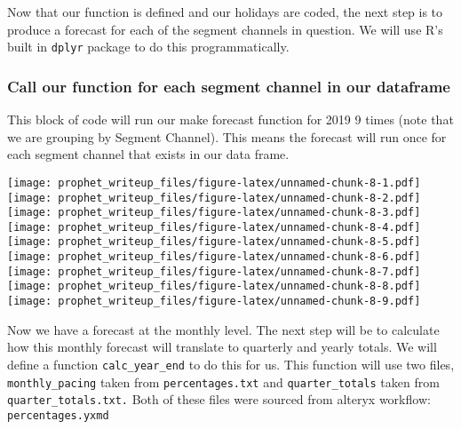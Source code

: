 \documentclass[]{article}
\newenvironment{Shaded}{\begin{snugshade}}{\end{snugshade}}
\newcommand{\KeywordTok}[1]{\textcolor[rgb]{0.13,0.29,0.53}{\textbf{{#1}}}}
\newcommand{\DecValTok}[1]{\textcolor[rgb]{0.00,0.00,0.81}{{#1}}}
\newcommand{\StringTok}[1]{\textcolor[rgb]{0.31,0.60,0.02}{{#1}}}
\newcommand{\NormalTok}[1]{{#1}}
\begin{document}
Now that our function is defined and our holidays are coded, the next
step is to produce a forecast for each of the segment channels in
question. We will use R's built in \texttt{dplyr} package to do this
programmatically.

\subsubsection{Call our function for each segment channel in our
dataframe}\label{call-our-function-for-each-segment-channel-in-our-dataframe}

This block of code will run our make forecast function for 2019 9 times
(note that we are grouping by Segment Channel). This means the forecast
will run once for each segment channel that exists in our data frame.

\begin{Shaded}
\end{Shaded}

\texttt{[image: prophet\_writeup\_files/figure-latex/unnamed-chunk-8-1.pdf]}
\texttt{[image: prophet\_writeup\_files/figure-latex/unnamed-chunk-8-2.pdf]}
\texttt{[image: prophet\_writeup\_files/figure-latex/unnamed-chunk-8-3.pdf]}
\texttt{[image: prophet\_writeup\_files/figure-latex/unnamed-chunk-8-4.pdf]}
\texttt{[image: prophet\_writeup\_files/figure-latex/unnamed-chunk-8-5.pdf]}
\texttt{[image: prophet\_writeup\_files/figure-latex/unnamed-chunk-8-6.pdf]}
\texttt{[image: prophet\_writeup\_files/figure-latex/unnamed-chunk-8-7.pdf]}
\texttt{[image: prophet\_writeup\_files/figure-latex/unnamed-chunk-8-8.pdf]}
\texttt{[image: prophet\_writeup\_files/figure-latex/unnamed-chunk-8-9.pdf]}

Now we have a forecast at the monthly level. The next step will be to
calculate how this monthly forecast will translate to quarterly and
yearly totals. We will define a function \texttt{calc\_year\_end} to do
this for us. This function will use two files, \texttt{monthly\_pacing}
taken from \texttt{percentages.txt} and \texttt{quarter\_totals} taken
from \texttt{quarter\_totals.txt.} Both of these files were sourced from
alteryx workflow: \texttt{percentages.yxmd}
\end{document}
